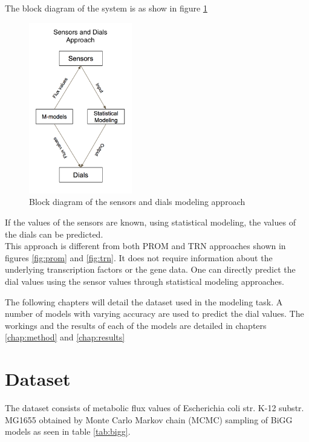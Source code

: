 \documentclass[12pt,chapterheads]{ucsd}
\begin{document}
The block diagram of the system is as show in figure \ref{fig:sys}

\begin{figure}[h] 
\centering
\includegraphics[width=0.4\textwidth]{my_model}
\caption[Block diagram of the sensors and dials modeling approach]
{Block diagram of the sensors and dials modeling approach}
\label{fig:sys}
\end{figure}

\vspace{0.25in}
If the values of the sensors are known, using statistical modeling, the values of the dials can be predicted.\\
This approach is different from both PROM and TRN approaches shown in figures \ref{fig:prom} and \ref{fig:trn}. It does not require information about the underlying transcription factors or the gene data. One can directly predict the dial values using the sensor values through statistical modeling approaches.

The following chapters will detail the dataset used in the modeling task. A number of models with varying accuracy are used to predict the dial values. The workings and the results of each of the models are detailed in chapters \ref{chap:method} and \ref{chap:results}

\chapter{Dataset}

The dataset consists of metabolic flux values of Escherichia coli str. K-12 substr. MG1655 \cite{Blattner1453} obtained by Monte Carlo Markov chain (MCMC) sampling of BiGG \cite{doi:10.1093/nar/gkv1049} models as seen in table \ref{tab:bigg}. 
\end{document}

